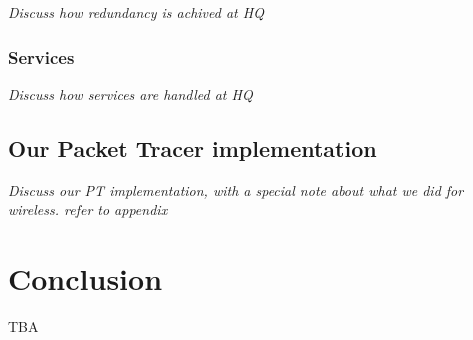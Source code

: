 \textit{Discuss how redundancy is achived at HQ}

\subsubsection{Services}

\textit{Discuss how services are handled at HQ}

\subsection{Our Packet Tracer implementation}

\textit{Discuss our PT implementation, with a special note about what we did for wireless. refer to appendix}

\section{Conclusion}
TBA


\clearpage %

\nocite{*}





\clearpage %
\appendix


